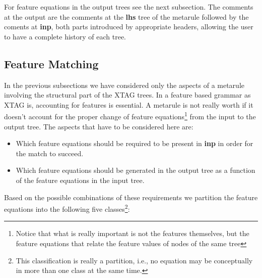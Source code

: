 For feature equations in the output trees see the
next subsection. The comments at the output are the comments at the {\bf lhs}
tree of the metarule followed by the coments at {\bf inp}, both parts 
introduced by appropriate headers, allowing the user to have a complete
history of each tree.

\subsection{Feature Matching}

In the previous subsections we have considered only the aspects of a metarule
involving the structural part of the XTAG trees. In a feature based grammar
as XTAG is, accounting for features is essential. A metarule is not really
worth if it doesn't account for the proper change of feature 
equations\footnote{Notice that what is really important is not the features
themselves, but the feature equations that relate the feature values of nodes
of the same tree} from the input to the output tree. 
The aspects that have to be considered here are:

\begin{itemize}
\item   Which feature equations should be required to be present in {\bf inp}
        in order for the match to succeed.

\item   Which feature equations should be generated in the output tree as a 
        function of the feature equations in the input tree.
\end{itemize}

Based on the possible combinations of these requirements we partition the 
feature equations into the following five classes\footnote{This 
classification is really a partition, i.e., no equation may be conceptually
in more than one class at the same time.}: 

